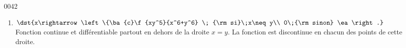 \begin{corrige}{0042}
\begin{alternative}
\begin{enumerate}
\item     $\dst{x\rightarrow \left\{\ba{c}\f{xy^5}{x^6+y^6} \; {\rm si}\;x\neq y\\
              			       0\;{\rm sinon} \ea\right.}$\\
Fonction continue et différentiable partout en dehors de la droite $x=y$.  La fonction est discontinue en chacun des points de cette droite.

\end{enumerate}
\end{alternative}






\end{corrige}

